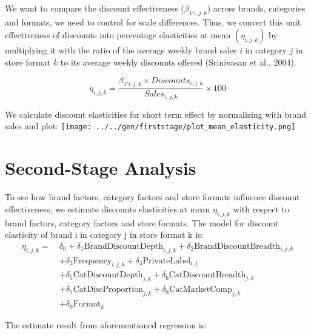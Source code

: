 \documentclass[
]{article}
\begin{document}
We want to compare the discount effectiveness (\(\beta_{1'i,j,k}\))
across brands, categories and formats, we need to control for scale
differences. Thus, we convert this unit effectiveness of discounts into
percentage elasticities at mean \((\eta_{i,j,k})\) by multiplying it
with the ratio of the average weekly brand sales \(i\) in category \(j\)
in store format \(k\) to its average weekly discounts offered
(Srinivasan et al., 2004).

\begin{equation*}
\eta_{i,j,k} = \frac{\beta_{1'i,j,k} \times Discounts_{i,j,k}}{Sales_{i,j,k}} \times 100
\end{equation*}

We calculate discount elasticities for short term effect by normalizing
with brand sales and plot:
\texttt{[image: ../../gen/firststage/plot\_mean\_elasticity.png]}

\newpage
\section{Second-Stage Analysis}

To see how brand factors, category factors and store formats influence
discount effectiveness, we estimate discounts elasticities at mean
\(\eta_{i,j,k}\) with respect to brand factors, category factors and
store formats. The model for discount elasticity of brand i in category
j in store format k is: \begin{align*}
    \eta_{i,j,k} =\ & \delta_0 + \delta_1 \text{BrandDiscountDepth}_{i,j,k} + \delta_2 \text{BrandDiscountBreadth}_{i,j,k} \nonumber \\
    & + \delta_3 \text{Frequency}_{i,j,k} + \delta_4 \text{PrivateLabel}_{i,j} \nonumber \\
    & + \delta_5 \text{CatDiscountDepth}_{j,k} + \delta_6 \text{CatDiscountBreadth}_{j,k} \nonumber \\
    & + \delta_7 \text{CatDiscProportion}_{j,k} + \delta_8 \text{CatMarketComp}_{j,k} \nonumber \\
    & + \delta_9 \text{Format}_{k}
\end{align*}

The estimate result from aforementioned regression is:
\end{document}
